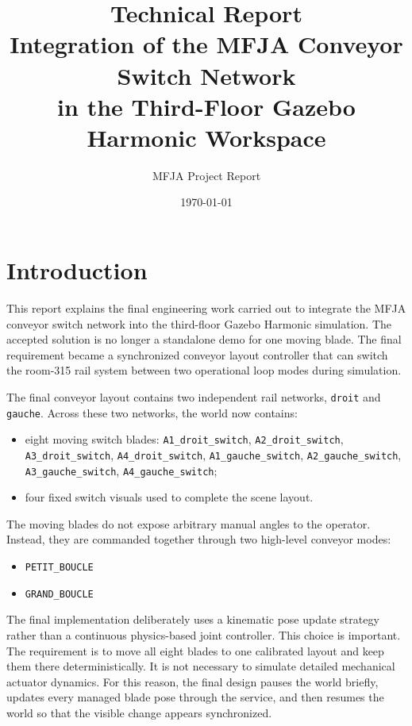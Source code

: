 \documentclass[11pt,a4paper]{article}
\title{Technical Report\\Integration of the MFJA Conveyor Switch Network\\in the Third-Floor Gazebo Harmonic Workspace}
\author{MFJA Project Report}
\date{\today}
\begin{document}
\maketitle
\tableofcontents
\clearpage

\section{Introduction}
This report explains the final engineering work carried out to integrate the MFJA conveyor switch network into the third-floor Gazebo Harmonic simulation. The accepted solution is no longer a standalone demo for one moving blade. The final requirement became a synchronized conveyor layout controller that can switch the room-315 rail system between two operational loop modes during simulation.

The final conveyor layout contains two independent rail networks, \texttt{droit} and \texttt{gauche}. Across these two networks, the world now contains:
\begin{itemize}
\item eight moving switch blades:
\texttt{A1\_droit\_switch}, \texttt{A2\_droit\_switch}, \texttt{A3\_droit\_switch}, \texttt{A4\_droit\_switch},
\texttt{A1\_gauche\_switch}, \texttt{A2\_gauche\_switch}, \texttt{A3\_gauche\_switch}, \texttt{A4\_gauche\_switch};
\item four fixed switch visuals used to complete the scene layout.
\end{itemize}

The moving blades do not expose arbitrary manual angles to the operator. Instead, they are commanded together through two high-level conveyor modes:
\begin{itemize}
\item \texttt{PETIT\_BOUCLE}
\item \texttt{GRAND\_BOUCLE}
\end{itemize}

The final implementation deliberately uses a kinematic pose update strategy rather than a continuous physics-based joint controller. This choice is important. The requirement is to move all eight blades to one calibrated layout and keep them there deterministically. It is not necessary to simulate detailed mechanical actuator dynamics. For this reason, the final design pauses the world briefly, updates every managed blade pose through the  service, and then resumes the world so that the visible change appears synchronized.
\end{document}
